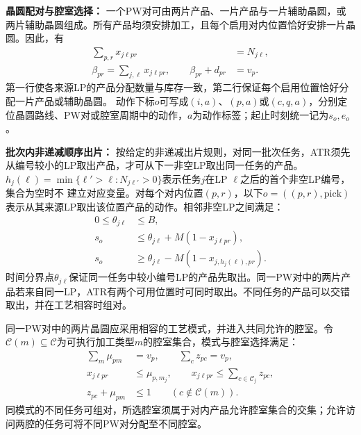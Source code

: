 \documentclass[final,5p,times,twocolumn]{elsarticle}
\begin{document}
\noindent\textbf{晶圆配对与腔室选择：}
一个PW对可由两片产品、一片产品与一片辅助晶圆，或两片辅助晶圆组成。所有产品均须安排加工，且每个启用对内位置恰好安排一片晶圆。因此，有
\begin{equation}
\begin{aligned}
\sum_{p,r}x_{j\ell pr}&=N_{j\ell},\\
\beta_{pr}=\sum_{j,\ell}x_{j\ell pr},\qquad
\beta_{pr}+d_{pr}&=v_p.
\end{aligned}
\label{eq:joint-membership-cn}
\end{equation}
第一行使各来源LP的产品分配数量与库存一致，第二行保证每个启用位置恰好分配一片产品或辅助晶圆。
动作下标$o$可写成$(i,a)$、$(p,a)$或$(c,q,a)$，分别定位晶圆路线、PW对或腔室周期中的动作，$a$为动作标签；起止时刻统一记为$s_o,e_o$。

\noindent\textbf{批次内非递减顺序出片：}
按给定的非递减出片规则，对同一批次任务，ATR须先从编号较小的LP取出产品，才可从下一非空LP取出同一任务的产品。
$h_j(\ell)=\min\{\ell'>\ell:N_{j\ell'}>0\}$表示任务$j$在LP $\ell$之后的首个非空LP编号，集合为空时不
建立对应变量。对每个对内位置$(p,r)$，以下$o=((p,r),\mathrm{pick})$表示从其来源LP取出该位置产品的动作。相邻非空LP之间满足：
\begin{equation}
\begin{aligned}
0\le\theta_{j\ell}&\le B,\\
s_o&\le\theta_{j\ell}+M(1-x_{j\ell pr}),\\
s_o&\ge\theta_{j\ell}-M(1-x_{j,h_j(\ell),pr}).
\end{aligned}
\label{eq:pjob-release-boundary-cn}
\end{equation}
时间分界点$\theta_{j\ell}$保证同一任务中较小编号LP的产品先取出。同一PW对中的两片产品若来自同一LP，ATR有两个可用位置时可同时取出。不同任务的产品可以交错取出，并在工艺相容时组对。

同一PW对中的两片晶圆应采用相容的工艺模式，并进入共同允许的腔室。令$\mathcal C(m)\subseteq\mathcal C$为可执行加工类型$m$的腔室集合，模式与腔室选择满足：
\begin{equation}
\begin{aligned}
\sum_m\mu_{pm}&=v_p,\qquad \sum_c z_{pc}=v_p,\\
x_{j\ell pr}&\le\mu_{p,m_j},\qquad
x_{j\ell pr}\le\sum_{c\in\mathcal C_j}z_{pc},\\
z_{pc}+\mu_{pm}&\le1\qquad(c\notin\mathcal C(m)).
\end{aligned}
\label{eq:joint-chamber-cn}
\end{equation}
同模式的不同任务可组对，所选腔室须属于对内产品允许腔室集合的交集；允许访问两腔的任务可将不同PW对分配至不同腔室。
\end{document}

